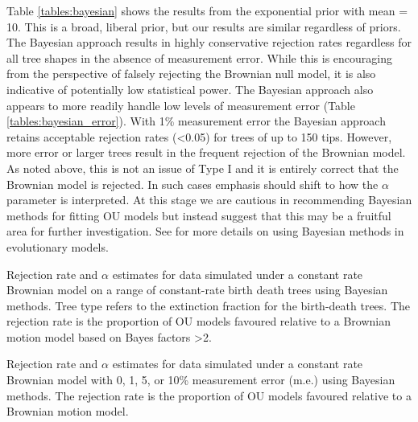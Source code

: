 \documentclass[a4paper,12pt]{article}
\begin{document}
\begin{enumerate}[(i)]
      Table \ref{tables:bayesian} shows the results from the exponential prior with mean = 10. This is a broad, liberal prior, but our results are similar regardless of priors. %
      The Bayesian approach results in highly conservative rejection rates regardless for all tree shapes in the absence of measurement error. 
      While this is encouraging from the perspective of falsely rejecting the Brownian null model, it is also indicative of potentially low statistical power. 
      The Bayesian approach also appears to more readily handle low levels of measurement error (Table \ref{tables:bayesian_error}). 
      With 1\% measurement error the Bayesian approach retains acceptable rejection rates (\textless 0.05) for trees of up to 150 tips. 
      However, more error or larger trees result in the frequent rejection of the Brownian model. 
      As noted above, this is not an issue of Type I and it is entirely correct that the Brownian model is rejected. 
      In such cases emphasis should shift to how the $\alpha$ parameter is interpreted. 
      At this stage we are cautious in recommending Bayesian methods for fitting OU models but instead suggest that this may be a fruitful area for further investigation. 
      See \citet{pennell2015model} for more details on using Bayesian methods in evolutionary models.
    \end{enumerate}

    \begin{table}[!htbp]
        \begin{center}
        \caption{Rejection rate and $\alpha$ estimates for data simulated under a constant rate Brownian model on a range of constant-rate birth death trees using Bayesian methods. Tree type refers to the extinction fraction for the birth-death trees. The rejection rate is the proportion of OU models favoured relative to a Brownian motion model based on Bayes factors \textgreater 2.} 
        \bigskip
         
        \label{tables:bayesian}
        \end{center}
\end{table} 

    \begin{landscape}
      \begin{table}[!htbp]
        \begin{center}
        \caption{Rejection rate and $\alpha$ estimates for data simulated under a constant rate Brownian model with 0, 1, 5, or 10\% measurement error (m.e.) using Bayesian methods. The rejection rate is the proportion of OU models favoured relative to a Brownian motion model.} %
        \bigskip
        
        \label{tables:bayesian_error}
        \end{center}
\end{table} 
    \end{landscape}
\end{document}
